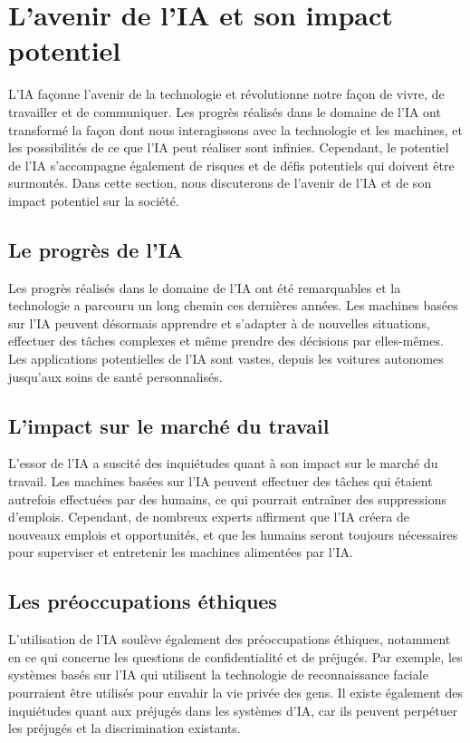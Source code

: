 \section{L'avenir de l'IA et son impact potentiel}
L'IA façonne l'avenir de la technologie et révolutionne notre façon de vivre, de travailler et de communiquer. Les progrès réalisés dans le domaine de l’IA ont transformé la façon dont nous interagissons avec la technologie et les machines, et les possibilités de ce que l’IA peut réaliser sont infinies. Cependant, le potentiel de l’IA s’accompagne également de risques et de défis potentiels qui doivent être surmontés\cite{fastercapital}. Dans cette section, nous discuterons de l’avenir de l’IA et de son impact potentiel sur la société.

\subsection{Le progrès de l’IA }
Les progrès réalisés dans le domaine de l’IA ont été remarquables et la technologie a parcouru un long chemin ces dernières années. Les machines basées sur l’IA peuvent désormais apprendre et s’adapter à de nouvelles situations, effectuer des tâches complexes et même prendre des décisions par elles-mêmes. Les applications potentielles de l’IA sont vastes, depuis les voitures autonomes jusqu’aux soins de santé personnalisés.

\subsection{L'impact sur le marché du travail}
L'essor de l'IA a suscité des inquiétudes quant à son impact sur le marché du travail. Les machines basées sur l’IA peuvent effectuer des tâches qui étaient autrefois effectuées par des humains, ce qui pourrait entraîner des suppressions d’emplois. Cependant, de nombreux experts affirment que l’IA créera de nouveaux emplois et opportunités, et que les humains seront toujours nécessaires pour superviser et entretenir les machines alimentées par l’IA.

\subsection{Les préoccupations éthiques}
L’utilisation de l’IA soulève également des préoccupations éthiques, notamment en ce qui concerne les questions de confidentialité et de préjugés. Par exemple, les systèmes basés sur l’IA qui utilisent la technologie de reconnaissance faciale pourraient être utilisés pour envahir la vie privée des gens. Il existe également des inquiétudes quant aux préjugés dans les systèmes d’IA, car ils peuvent perpétuer les préjugés et la discrimination existants.

